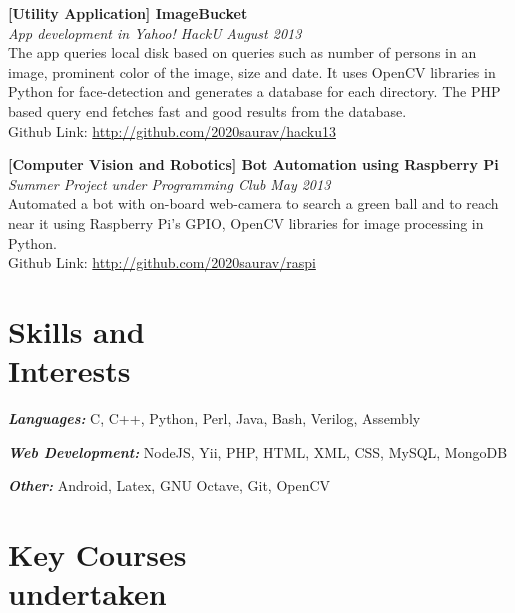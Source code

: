 \documentclass[margin,10pt]{resume}
\begin{document}
\begin{resume}
\begin{list2}
\item \textbf{[Utility Application] ImageBucket}  \\
\textsl{App development in Yahoo! HackU} \hfill \emph{August 2013}\\
The app queries local disk based on queries such as number of persons in an image, prominent color of the image, size and date. It uses OpenCV libraries in Python for face-detection and generates a database for each directory. The PHP based query end fetches fast and good results from the database.\\
Github Link: \url{http://github.com/2020saurav/hacku13}\\

\item\textbf{[Computer Vision and Robotics] Bot Automation using Raspberry Pi} \\
    \textsl{Summer Project under Programming Club} \hfill \emph{May 2013}\\
Automated a bot with on-board web-camera to search a green ball and to reach near it using Raspberry Pi's GPIO, OpenCV libraries for image processing in Python.\\
Github Link: \url{http://github.com/2020saurav/raspi}\\

\end{list2}
\section{\mysidestyle Skills and\\Interests } 
\vspace{2mm}
\begin{list2}
\item \emph{\textbf {Languages:}} C, C++, Python, Perl, Java, Bash, Verilog, Assembly
\item \emph{\textbf{Web Development:}} NodeJS, Yii, PHP, HTML, XML, CSS, MySQL, MongoDB
\item \emph{\textbf{Other:}} Android, Latex, GNU Octave, Git, OpenCV
\end{list2}


\section{\mysidestyle Key Courses\\undertaken } 
\vspace{2mm}
\begin{table}[h]
\renewcommand{\arraystretch}{1.3}


\end{table}
\end{resume}
\end{document}
